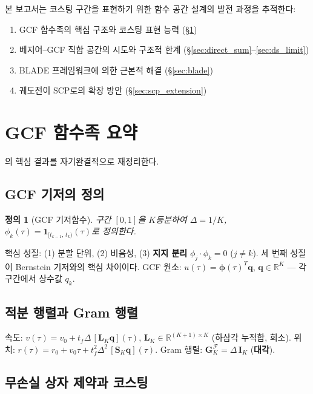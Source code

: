 \documentclass[11pt]{article}
\newtheorem{definition}{정의}
\begin{document}
본 보고서는 코스팅 구간을 표현하기 위한 함수 공간 설계의 발전 과정을 추적한다:
\begin{enumerate}
\item GCF 함수족의 핵심 구조와 코스팅 표현 능력 (\S\ref{sec:gcf})
\item 베지어--GCF 직합 공간의 시도와 구조적 한계 (\S\ref{sec:direct_sum}--\ref{sec:ds_limit})
\item BLADE 프레임워크에 의한 근본적 해결 (\S\ref{sec:blade})
\item 궤도전이 SCP로의 확장 방안 (\S\ref{sec:scp_extension})
\end{enumerate}


\section{GCF 함수족 요약}
\label{sec:gcf}

\cite{efc001}의 핵심 결과를 자기완결적으로 재정리한다.

\subsection{GCF 기저의 정의}

\begin{definition}[GCF 기저함수]
구간 $[0,1]$을 $K$등분하여 $\Delta = 1/K$,
$\phi_k(\tau) = \mathbf{1}_{[t_{k-1},\, t_k)}(\tau)$로 정의한다.
\end{definition}

핵심 성질: (1) 분할 단위, (2) 비음성, (3) \textbf{지지 분리}
$\phi_j \cdot \phi_k = 0$ ($j \ne k$).
세 번째 성질이 Bernstein 기저와의 핵심 차이이다.
GCF 원소: $u(\tau) = \boldsymbol{\phi}(\tau)^T \mathbf{q}$, $\mathbf{q} \in \mathbb{R}^K$
--- 각 구간에서 상수값 $q_k$.

\subsection{적분 행렬과 Gram 행렬}

속도: $v(\tau) = v_0 + t_f \Delta\, [\mathbf{L}_K \mathbf{q}](\tau)$,
$\mathbf{L}_K \in \mathbb{R}^{(K{+}1)\times K}$ (하삼각 누적합, 희소).
위치: $r(\tau) = r_0 + v_0 \tau + t_f^2 \Delta^2\, [\mathbf{S}_K \mathbf{q}](\tau)$.
Gram 행렬: $\mathbf{G}_K^{\mathcal{F}} = \Delta\, \mathbf{I}_K$ (\textbf{대각}).

\subsection{무손실 상자 제약과 코스팅}
\end{document}
